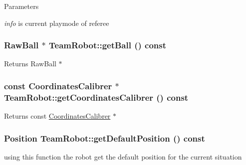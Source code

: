 \begin{DoxyParams}{Parameters}
\item[{\em info}]is current playmode of referee \end{DoxyParams}
\hypertarget{classTeamRobot_a86dbc3bbf6fdcebd4ae41a6f68d92a15}{
\subsubsection[{getBall}]{\setlength{\rightskip}{0pt plus 5cm}RawBall $\ast$ TeamRobot::getBall () const}}
\label{classTeamRobot_a86dbc3bbf6fdcebd4ae41a6f68d92a15}
\begin{DoxyReturn}{Returns}
RawBall $\ast$ 
\end{DoxyReturn}
\hypertarget{classTeamRobot_a3ef7d4538226085ed4d92b8bd2fce67d}{
\subsubsection[{getCoordinatesCalibrer}]{\setlength{\rightskip}{0pt plus 5cm}const {\bf CoordinatesCalibrer} $\ast$ TeamRobot::getCoordinatesCalibrer () const}}
\label{classTeamRobot_a3ef7d4538226085ed4d92b8bd2fce67d}
\begin{DoxyReturn}{Returns}
const \hyperlink{classCoordinatesCalibrer}{CoordinatesCalibrer} $\ast$ 
\end{DoxyReturn}
\hypertarget{classTeamRobot_acd11ff6d9651a8deddafa5bd9a30865c}{
\subsubsection[{getDefaultPosition}]{\setlength{\rightskip}{0pt plus 5cm}Position TeamRobot::getDefaultPosition () const}}
\label{classTeamRobot_acd11ff6d9651a8deddafa5bd9a30865c}


using this function the robot get the default position for the current situation 

